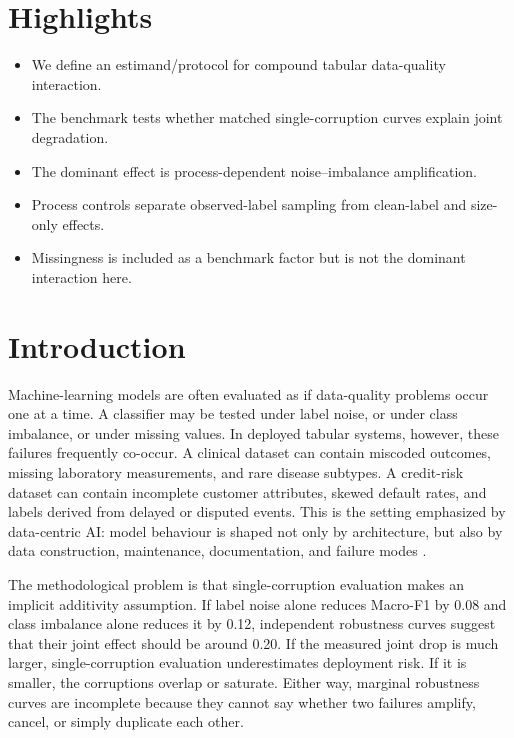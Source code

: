 \documentclass[preprint,12pt,number]{elsarticle}
\begin{document}
\section*{Highlights}
\begin{itemize}
    \item We define an estimand/protocol for compound tabular data-quality interaction.
    \item The benchmark tests whether matched single-corruption curves explain joint degradation.
    \item The dominant effect is process-dependent noise--imbalance amplification.
    \item Process controls separate observed-label sampling from clean-label and size-only effects.
    \item Missingness is included as a benchmark factor but is not the dominant interaction here.
\end{itemize}

\section{Introduction}

Machine-learning models are often evaluated as if data-quality problems occur one at a time. A classifier may be tested under label noise, or under class imbalance, or under missing values. In deployed tabular systems, however, these failures frequently co-occur. A clinical dataset can contain miscoded outcomes, missing laboratory measurements, and rare disease subtypes. A credit-risk dataset can contain incomplete customer attributes, skewed default rates, and labels derived from delayed or disputed events. This is the setting emphasized by data-centric AI: model behaviour is shaped not only by architecture, but also by data construction, maintenance, documentation, and failure modes \citep{sambasivan2021data,zha2025datacentric,paullada2021data,hooker2021moving}.

The methodological problem is that single-corruption evaluation makes an implicit additivity assumption. If label noise alone reduces Macro-F1 by 0.08 and class imbalance alone reduces it by 0.12, independent robustness curves suggest that their joint effect should be around 0.20. If the measured joint drop is much larger, single-corruption evaluation underestimates deployment risk. If it is smaller, the corruptions overlap or saturate. Either way, marginal robustness curves are incomplete because they cannot say whether two failures amplify, cancel, or simply duplicate each other.
\end{document}
